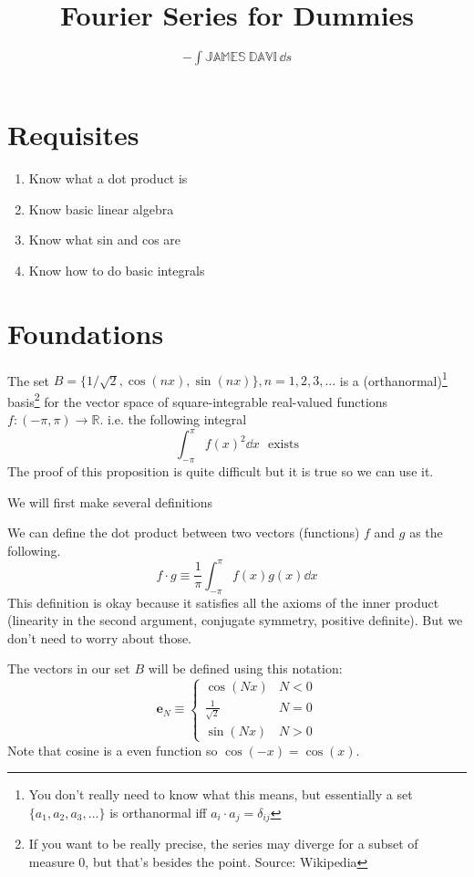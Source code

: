 \documentclass{article}
\title{Fourier Series for Dummies}
\author{$-\int \mathbb{JAMES\:DAVI}\,\dd s$}
\newcommand{\ve}{\mathbf}
\newcommand{\R}{\mathbb{R}}
\newcommand{\1}{\mathbbm{1}}
\begin{document}
\maketitle

\section{Requisites}
\begin{enumerate}
    \item Know what a dot product is
    \item Know basic linear algebra
    \item Know what sin and cos are
    \item Know how to do basic integrals
\end{enumerate}

\section{Foundations}
\begin{proposition}
    The set $B=\{1/\sqrt 2,\cos(nx),\sin(nx)\}, n=1,2,3,\dots$ is a (orthanormal)\footnote{You don't really need to know what this means, but essentially a set $\{a_1,a_2,a_3,\dots\}$ is orthanormal iff $a_i\cdot a_j=\delta_{ij}$} basis\footnote{If you want to be really precise, the series may diverge for a subset of measure 0, but that's besides the point. Source: Wikipedia} for the vector space of square-integrable real-valued functions $f:(-\pi,\pi)\to\R$. i.e.
    the following integral
    \begin{equation}
        \int_{-\pi}^\pi f(x)^2\dd x \:\:\:\text{exists}
    \end{equation}
    The proof of this proposition is quite difficult but it is true so we can use it.
\end{proposition}
We will first make several definitions
\begin{definition}
    We can define the dot product between two vectors (functions) $f$ and $g$ as the following.
    \begin{equation}
        f\cdot g\equiv\frac{1}{\pi}\int_{-\pi}^\pi f(x)g(x)\dd x\label{dot}
    \end{equation}
    This definition is okay because it satisfies all the axioms of the inner product (linearity in the second argument, conjugate symmetry, positive definite). But we don't need to worry about those.
\end{definition}
\begin{definition}
    The vectors in our set $B$ will be defined using this notation:
    \begin{equation}
        \ve e_N\equiv\begin{cases}
            \cos(Nx) & N<0\\
            \frac{1}{\sqrt 2} & N=0\\
            \sin(Nx) & N>0
        \end{cases}
    \end{equation}
    Note that cosine is a even function so $\cos(-x)=\cos(x)$.
\end{definition}
\end{document}
